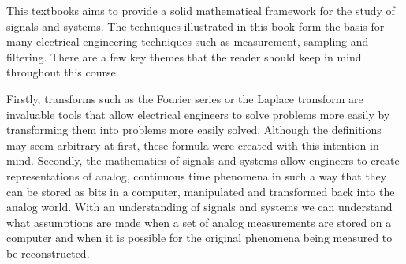 \documentclass{article}
\begin{document}
    This textbooks aims to provide a solid mathematical framework for the study of signals and systems.
    The techniques illustrated in this book form the basis for many electrical engineering techniques such as measurement, sampling and filtering.
    There are a few key themes that the reader should keep in mind throughout this course.

    Firstly, transforms such as the Fourier series or the Laplace transform are invaluable tools that allow electrical engineers to solve problems more easily by transforming them into problems more easily solved.
    Although the definitions may seem arbitrary at first, these formula were created with this intention in mind.
    Secondly, the mathematics of signals and systems allow engineers to create representations of analog, continuous time phenomena in such a way that they can be stored as bits in a computer, manipulated and transformed back into the analog world. 
    With an understanding of signals and systems we can understand what assumptions are made when a set of analog measurements are stored on a computer and when it is possible for the original phenomena being measured to be reconstructed.
\end{document}
